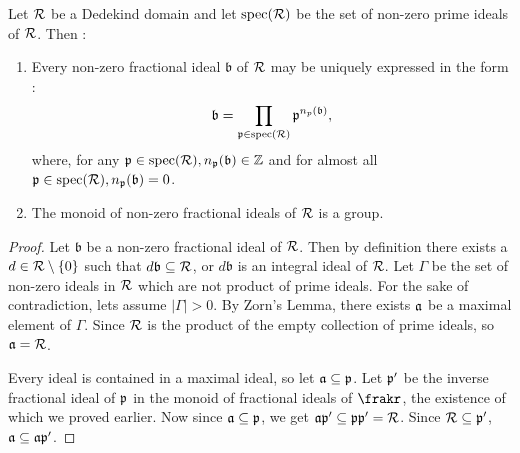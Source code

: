 \begin{theorem}
  Let $\mathcal{R}$ be a Dedekind domain and let $\operatorname{spec}(\mathcal{R})$ be the set of non-zero prime ideals of $\mathcal{R}$. Then :
  \begin{enumerate}
    \item Every non-zero fractional ideal $\mathfrak{b}$ of $\mathcal{R}$ may be uniquely expressed in the form :
    \[\mathfrak{b} = \prod_{\mathfrak{p}\in \operatorname{spec}(\mathcal{R})} {\mathfrak{p}}^{n_p(\mathfrak{b})},\]
    where, for any $\mathfrak{p}\in \operatorname{spec}(\mathcal{R}),n_{\mathfrak{p}}(\mathfrak{b})\in \mathbb{Z}$ and for almost all $\mathfrak{p}\in \operatorname{spec}(\mathcal{R}), n_{\mathfrak{p}}(\mathfrak{b}) = 0$.
    \item The monoid of non-zero fractional ideals of $\mathcal{R}$ is a group.
  \end{enumerate}
\end{theorem}

\begin{proof}
  Let $\mathfrak{b}$ be a non-zero fractional ideal of $\mathcal{R}$. Then by definition there exists a $d\in \mathcal{R}\setminus \{0\}$ such that $d\mathfrak{b}\subseteq \mathcal{R}$, or $d\mathfrak{b}$ is an integral ideal of $\mathcal{R}$. Let $\Gamma$ be the set of non-zero ideals in $\mathcal{R}$ which are not product of prime ideals. For the sake of contradiction, lets assume $|\Gamma|>0$. By Zorn's Lemma, there exists $\mathfrak{a}$ be a maximal element of $\Gamma$. Since $\mathcal{R}$ is the product of the empty collection of prime ideals, so $\mathfrak{a} = \mathcal{R}$.

   Every ideal is contained in a maximal ideal, so let $\mathfrak{a} \subseteq \mathfrak{p}$. Let $\mathfrak{p}'$ be the inverse fractional ideal of $\mathfrak{p}$ in the monoid of fractional ideals of $\frakr$, the existence of which we proved earlier. Now since $\mathfrak{a} \subseteq \mathfrak{p}$, we get $\mathfrak{a}\mathfrak{p}' \subseteq \mathfrak{p}\mathfrak{p}' = \mathcal{R}$. Since $\mathcal{R} \subseteq \mathfrak{p}'$, $\mathfrak{a} \subseteq \mathfrak{a}\mathfrak{p}'$.
\end{proof}
